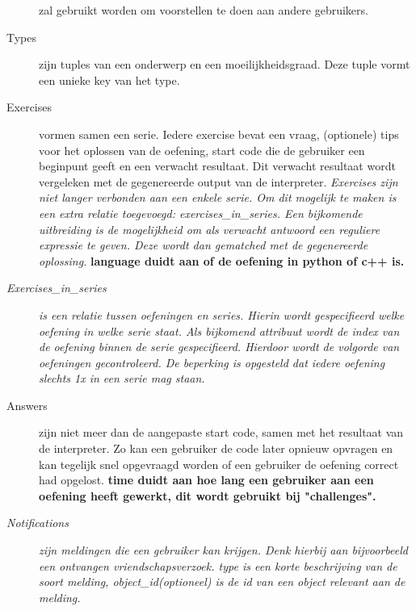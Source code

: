 \begin{description}
        zal gebruikt worden om voorstellen te doen aan andere gebruikers.
    \item[Types] zijn tuples van een onderwerp en een moeilijkheidsgraad. Deze tuple vormt een
        unieke key van het type.
    \item[Exercises] vormen samen een serie. Iedere exercise bevat een vraag, (optionele) tips voor
        het oplossen van de oefening, start code die de gebruiker een beginpunt geeft en een verwacht resultaat.
        Dit verwacht resultaat wordt vergeleken met de gegenereerde output van de interpreter. \textsl{Exercises
        zijn niet langer verbonden aan een enkele serie. Om dit mogelijk te maken is een extra relatie toegevoegd:
        exercises\_in\_series. Een bijkomende uitbreiding is de mogelijkheid om als verwacht antwoord een reguliere
        expressie te geven. Deze wordt dan gematched met de gegenereerde oplossing.}
        \textbf{language duidt aan of de oefening in python of c++ is.}
    \item[\textsl{Exercises\_in\_series}] \textsl{is een relatie tussen oefeningen en series. Hierin wordt gespecifieerd welke oefening
        in welke serie staat. Als bijkomend attribuut wordt de index van de oefening binnen de serie gespecifieerd.
        Hierdoor wordt de volgorde van oefeningen gecontroleerd. De beperking is opgesteld dat iedere oefening slechts 1x
        in een serie mag staan.}
    \item[Answers] zijn niet meer dan de aangepaste start code, samen met het resultaat
        van de interpreter. Zo kan een gebruiker de code later opnieuw opvragen en kan tegelijk snel
        opgevraagd worden of een gebruiker de oefening correct had opgelost.
        \textbf{time duidt aan hoe lang een gebruiker aan een oefening heeft gewerkt, dit wordt gebruikt
        bij "challenges".}
    \item[\textsl{Notifications}] \textsl{zijn meldingen die een gebruiker kan krijgen. Denk hierbij aan bijvoorbeeld een
        ontvangen vriendschapsverzoek. type is een korte beschrijving van de soort melding, object\_id(optioneel) is
        de id van een object relevant aan de melding.}
\end{description}
